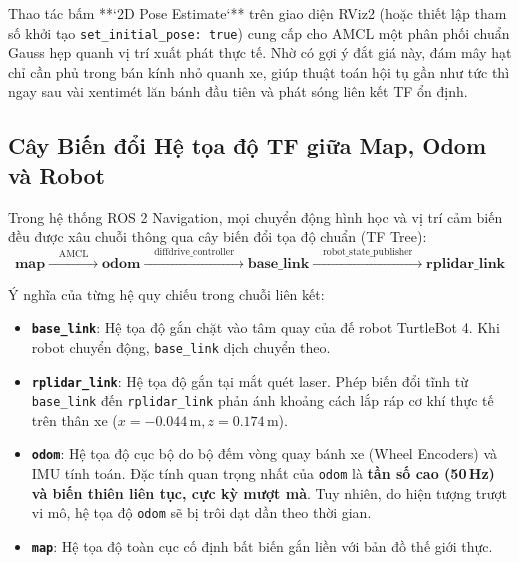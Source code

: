 \documentclass[12pt, a4paper]{article}
\begin{document}
Thao tác bấm **`2D Pose Estimate`** trên giao diện RViz2 (hoặc thiết lập tham số khởi tạo \texttt{set\_initial\_pose: true}) cung cấp cho AMCL một phân phối chuẩn Gauss hẹp quanh vị trí xuất phát thực tế. Nhờ có gợi ý đắt giá này, đám mây hạt chỉ cần phủ trong bán kính nhỏ quanh xe, giúp thuật toán hội tụ gần như tức thì ngay sau vài xentimét lăn bánh đầu tiên và phát sóng liên kết TF ổn định.

\subsection{Cây Biến đổi Hệ tọa độ TF giữa Map, Odom và Robot}
Trong hệ thống ROS 2 Navigation, mọi chuyển động hình học và vị trí cảm biến đều được xâu chuỗi thông qua cây biến đổi tọa độ chuẩn (TF Tree):
$$\mathbf{map} \xrightarrow{\quad \text{AMCL} \quad} \mathbf{odom} \xrightarrow{\quad \text{diffdrive\_controller} \quad} \mathbf{base\_link} \xrightarrow{\quad \text{robot\_state\_publisher} \quad} \mathbf{rplidar\_link}$$

Ý nghĩa của từng hệ quy chiếu trong chuỗi liên kết:
\begin{itemize}
    \item \textbf{\texttt{base\_link}}: Hệ tọa độ gắn chặt vào tâm quay của đế robot TurtleBot 4. Khi robot chuyển động, \texttt{base\_link} dịch chuyển theo.
    \item \textbf{\texttt{rplidar\_link}}: Hệ tọa độ gắn tại mắt quét laser. Phép biến đổi tĩnh từ \texttt{base\_link} đến \texttt{rplidar\_link} phản ánh khoảng cách lắp ráp cơ khí thực tế trên thân xe ($x = -0.044\,\text{m}, z = 0.174\,\text{m}$).
    \item \textbf{\texttt{odom}}: Hệ tọa độ cục bộ do bộ đếm vòng quay bánh xe (Wheel Encoders) và IMU tính toán. Đặc tính quan trọng nhất của \texttt{odom} là \textbf{tần số cao (50\,Hz) và biến thiên liên tục, cực kỳ mượt mà}. Tuy nhiên, do hiện tượng trượt vi mô, hệ tọa độ \texttt{odom} sẽ bị trôi dạt dần theo thời gian.
    \item \textbf{\texttt{map}}: Hệ tọa độ toàn cục cố định bất biến gắn liền với bản đồ thế giới thực.
\end{itemize}
\end{document}
